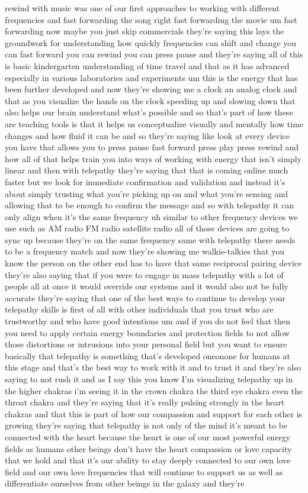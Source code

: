 \documentclass{article}
\begin{document}
rewind with music was one of our first approaches to working with different frequencies and fast forwarding the song right fast forwarding the movie um fast forwarding now maybe you just skip commercials they're saying this lays the groundwork for understanding how quickly frequencies can shift and change you can fast forward you can rewind you can press pause and they're saying all of this is basic kindergarten understanding of time travel and that as it has advanced especially in various laboratories and experiments um this is the energy that has been further developed and now they're showing me a clock an analog clock and that as you visualize the hands on the clock speeding up and slowing down that also helps our brain understand what's possible and so that's part of how these are teaching tools is that it helps us conceptualize visually and mentally how time changes and how fluid it can be and so they're saying like look at every device you have that allows you to press pause fast forward press play press rewind and how all of that helps train you into ways of working with energy that isn't simply linear and then with telepathy they're saying that that is coming online much faster but we look for immediate confirmation and validation and instead it's about simply trusting what you're picking up on and what you're sensing and allowing that to be enough to confirm the message and so with telepathy it can only align when it's the same frequency uh similar to other frequency devices we use such as AM radio FM radio satellite radio all of those devices are going to sync up because they're on the same frequency same with telepathy there needs to be a frequency match and now they're showing me walkie-talkies that you know the person on the other end has to have that same reciprocal pairing device they're also saying that if you were to engage in mass telepathy with a lot of people all at once it would override our systems and it would also not be fully accurate they're saying that one of the best ways to continue to develop your telepathy skills is first of all with other individuals that you trust who are trustworthy and who have good intentions um and if you do not feel that then you need to apply certain energy boundaries and protection fields to not allow those distortions or intrusions into your personal field but you want to ensure basically that telepathy is something that's developed oneonone for humans at this stage and that's the best way to work with it and to trust it and they're also saying to not rush it and as I say this you know I'm visualizing telepathy up in the higher chakras i'm seeing it in the crown chakra the third eye chakra even the throat chakra and they're saying that it's really pulsing strongly in the heart chakras and that this is part of how our compassion and support for each other is growing they're saying that telepathy is not only of the mind it's meant to be connected with the heart because the heart is one of our most powerful energy fields as humans other beings don't have the heart compassion or love capacity that we hold and that it's our ability to stay deeply connected to our own love field and our own love frequencies that will continue to support us as well as differentiate ourselves from other beings in the galaxy and they're 
\end{document}
